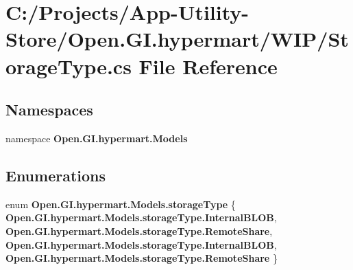 \section{C\+:/\+Projects/\+App-\/\+Utility-\/\+Store/\+Open.G\+I.\+hypermart/\+W\+I\+P/\+Storage\+Type.cs File Reference}
\label{_w_i_p_2_storage_type_8cs}
\subsection*{Namespaces}
\begin{DoxyCompactItemize}
\item 
namespace \textbf{ Open.\+G\+I.\+hypermart.\+Models}
\end{DoxyCompactItemize}
\subsection*{Enumerations}
\begin{DoxyCompactItemize}
\item 
enum \textbf{ Open.\+G\+I.\+hypermart.\+Models.\+storage\+Type} \{ \textbf{ Open.\+G\+I.\+hypermart.\+Models.\+storage\+Type.\+Internal\+B\+L\+OB}, 
\textbf{ Open.\+G\+I.\+hypermart.\+Models.\+storage\+Type.\+Remote\+Share}, 
\textbf{ Open.\+G\+I.\+hypermart.\+Models.\+storage\+Type.\+Internal\+B\+L\+OB}, 
\textbf{ Open.\+G\+I.\+hypermart.\+Models.\+storage\+Type.\+Remote\+Share}
 \}
\end{DoxyCompactItemize}
